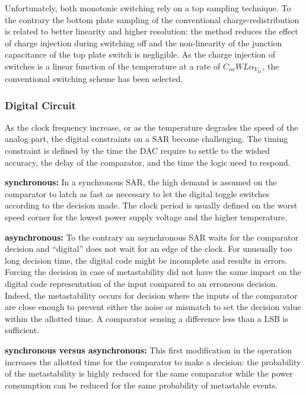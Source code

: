 Unfortunately, both monotonic switching rely on a top sampling technique. To the contrary the bottom plate sampling of the conventional charge-redistribution is related to better linearity and higher resolution: the method reduces the effect of charge injection during switching off and the non-linearity of the junction capacitance of the top plate switch is negligible. As the charge injection of switches is a linear function of the temperature at a rate of \(C_{ox}WL\alpha_{V_{th}}\), the conventional switching scheme has been selected.

	\subsubsection{Digital Circuit}         %
As the clock frequency increase, or as the temperature degrades the speed of the analog part, the digital constraints on a SAR become challenging. The timing constraint is defined by the time the DAC require to settle to the wished accuracy, the delay of the comparator, and the time the logic need to respond.

\textbf{\textcolor{black}{synchronous:}}
In a synchronous SAR, the high demand is assumed on the comparator to latch as fast as necessary to let the digital toggle switches according to the decision made. The clock period is usually defined on the worst speed corner for the lowest power supply voltage and the higher temperature.

\textbf{\textcolor{black}{asynchronous:}}
To the contrary an asynchronous SAR waits for the comparator decision and ``digital'' does not wait for an edge of the clock. For unusually too long decision time, the digital code might be incomplete and results in errors. Forcing the decision in case of metastability did not have the same impact on the digital code representation of the input compared to an erroneous decision. Indeed, the metastability occurs for decision where the inputs of the comparator are close enough to prevent either the noise or mismatch to set the decision value within the allotted time. A comparator sensing a difference less than a LSB is sufficient.

\textbf{\textcolor{black}{synchronous versus asynchronous:}}
This first modification in the operation increases the allotted time for the comparator to make a decision: the probability of the metastability is highly reduced for the same comparator while the power consumption can be reduced for the same probability of metastable events.

